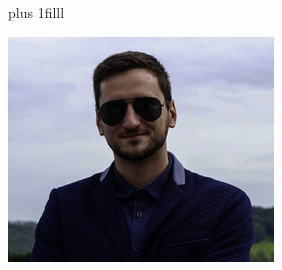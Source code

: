 \documentclass{photobook} %
\begin{document}
\maketitle
\pagestyle{empty}
\begin{minipage}{\imgwidth}%
\drawtrimcorners%
\vskip0pt plus 1filll
\begin{minipage}{\imgwidth}%
 \hfil\includegraphics[width=\imgwidth,height=\imgheight,keepaspectratio]{vg.jpg}\hfil
\end{minipage}
\end{minipage}
\newpage
\end{document}
